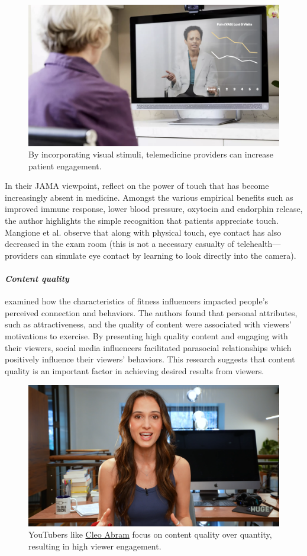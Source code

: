 \documentclass[utf8]{FrontiersinHarvard} %
\begin{document}
\begin{figure}[!htbp]
\centering
\includegraphics[width=0.7\linewidth]{files/tgSYYIag2qhHH1yPOHt4-c77b8307c73b95298dc04b4f2840fad3.png}
\caption[]{By incorporating visual stimuli, telemedicine providers can increase patient engagement.}
\label{SK3YTBY2uG}
\end{figure}

In their JAMA viewpoint, \citet{Mangione2024Out} reflect on the power of touch that has become increasingly absent in medicine. Amongst the various empirical benefits such as improved immune response, lower blood pressure, oxytocin and endorphin release, the author highlights the simple recognition that patients appreciate touch. Mangione et al. observe that along with physical touch, eye contact has also decreased in the exam room (this is not a necessary casualty of telehealth---providers can simulate eye contact by learning to look directly into the camera).

\paragraph{\textit{Content quality}}

\citet{liImpactFitnessInfluencers2023} examined how the characteristics of fitness influencers impacted people's perceived connection and behaviors. The authors found that personal attributes, such as attractiveness, and the quality of content were associated with viewers' motivations to exercise. By presenting high quality content and engaging with their viewers, social media influencers facilitated parasocial relationships which positively influence their viewers' behaviors. This research suggests that content quality is an important factor in achieving desired results from viewers.

\begin{figure}[!htbp]
\centering
\includegraphics[width=0.7\linewidth]{files/tgSYYIag2qhHH1yPOHt4-db6d6688b7f8393cad2cd5dd9f11513c.png}
\caption[]{YouTubers like \href{https://youtube.com/@cleoabram}{Cleo Abram} focus on content quality over quantity, resulting in high viewer engagement.}
\label{ClmRhKctf5}
\end{figure}
\end{document}
